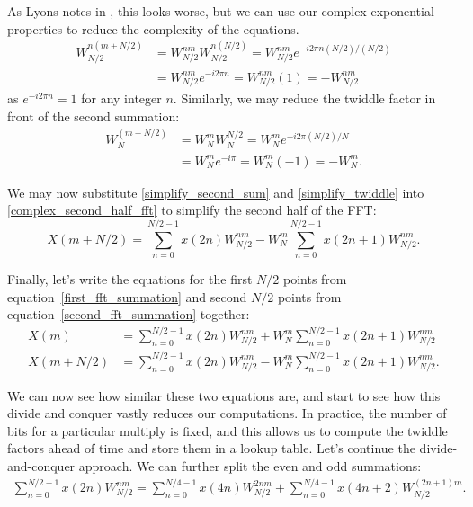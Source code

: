\documentclass[psamsfonts,reqno]{amsart}
\theoremstyle{definition}
\theoremstyle{remark}
\numberwithin{equation}{section}
\begin{document}
As Lyons notes in \cite{lyons1997understanding}, this looks worse, but we can use our complex exponential properties to reduce the complexity of the equations.
\begin{align}
	\label{simplify_second_sum}
	W_{N/2}^{n(m+N/2)} &= W_{N/2}^{nm} W_{N/2}^{n(N/2)} = W_{N/2}^{nm} e^{-i2 \pi n(N/2)/(N/2)}  \\
	&= W_{N/2}^{nm} e^{-i 2 \pi n} = W_{N/2}^{nm}(1) = -W_{N/2}^{nm}
\end{align}
as $e^{-i 2 \pi n} = 1$ for any integer $n$. Similarly, we may reduce the twiddle factor in front of the second summation:
\begin{align}
	\label{simplify_twiddle}
	W_N^{(m+N/2)} &= W_N^m W_N^{N/2} = W_N^m e^{-i 2 \pi (N/2)/N} \\
	&= W_N^m e^{-i \pi} = W_N^m(-1) = -W_N^m.
\end{align}

We may now substitute \ref{simplify_second_sum} and \ref{simplify_twiddle} into \ref{complex_second_half_fft} to simplify the second half of the FFT:
\begin{equation}
	\label{second_fft_summation}
	X(m+N/2) = \sum_{n=0}^{N/2-1} x(2n) W_{N/2}^{nm} - W_N^m \sum_{n=0}^{N/2-1} x(2n+1) W_{N/2}^{nm}.
\end{equation}

Finally, let's write the equations for the first $N/2$ points from equation~\ref{first_fft_summation} and second $N/2$ points from equation~\ref{second_fft_summation} together:
\begin{align}
	X(m) &= \sum_{n=0}^{N/2-1} x(2n) W_{N/2}^{nm} + W_N^m \sum_{n=0}^{N/2-1} x(2n+1) W_{N/2}^{nm} \\
	X(m+N/2) &= \sum_{n=0}^{N/2-1} x(2n) W_{N/2}^{nm} - W_N^m \sum_{n=0}^{N/2-1} x(2n+1) W_{N/2}^{nm}.
\end{align}

We can now see how similar these two equations are, and start to see how this divide and conquer vastly reduces our computations. In practice, the number of bits for a particular multiply is fixed, and this allows us to compute the twiddle factors ahead of time and store them in a lookup table. Let's continue the divide-and-conquer approach. We can further split the even and odd summations:
\begin{align*}
	\sum_{n=0}^{N/2-1} x(2n) W_{N/2}^{nm} = \sum_{n=0}^{N/4-1} x(4n) W_{N/2}^{2nm} + \sum_{n=0}^{N/4-1} x(4n+2) W_{N/2}^{(2n+1)m}.
\end{align*}
\end{document}
